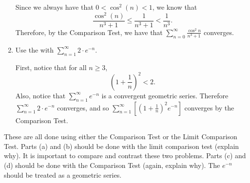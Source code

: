 \documentclass[handout]{ximera}
\begin{document}
\begin{problem}
\begin{freeResponse}
\begin{enumerate}
		Since we always have that $0 < \cos^2(n) < 1$, we know that
			\[
			\frac{\cos^2(n)}{n^3 + 1} \leq \frac{1}{n^3+1} < \frac{1}{n^3}.
			\]
		Therefore, by the Comparison Test, we have that $\sum_{n=0}^\infty \frac{\cos^2 n}{n^3+1}$ converges.
		
		
		
		\item  Use the  with $\sum_{n=1}^\infty 2 \cdot e^{-n}$.
		
		First, notice that for all $n \geq 3$,
			\[
			\left( 1 + \frac{1}{n} \right)^2 < 2.
			\]		
		Also, notice that $\sum_{n=1}^\infty e^{-n}$ is a convergent geometric series.  
		Therefore $\sum_{n=1}^\infty 2 \cdot e^{-n}$ converges, and so $\sum_{n=1}^\infty \left[ \left( 1+\frac{1}{n} \right)^2 e^{-n} \right]$ converges by the Comparison Test.
		
		\end{enumerate}
	\end{freeResponse}

\end{problem}

\begin{instructorNotes}
These are all done using either the Comparison Test or the Limit Comparison Test.  
Parts (a) and (b) should be done with the limit comparison test (explain why).  
It is important to compare and contrast these two problems.  
Parts (c) and (d) should be done with the Comparison Test (again, explain why).  
The $e^{-n}$ should be treated as a geometric series.
\end{instructorNotes}
















	
	
	
	
	
	
	
	
	

	










								
				
				
	
\end{document}
